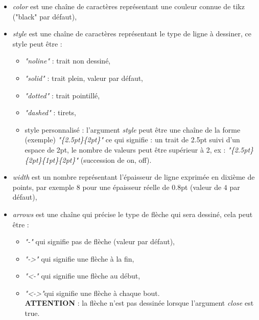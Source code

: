 \begin{itemize}
\item \emph{color} est une chaîne de caractères représentant une couleur connue de tikz ("black" par défaut),
\item \emph{style} est une chaîne de caractères représentant le type de ligne à dessiner, ce style peut être :
 \begin{itemize}
  \item \emph{"noline"} : trait non dessiné,
  \item \emph{"solid"} : trait plein, valeur par défaut,
  \item \emph{"dotted"} : trait pointillé,
  \item \emph{"dashed"} : tirets,
  \item style personnalisé : l'argument \emph{style} peut être une chaîne de la forme (exemple) \emph{"\{2.5pt\}\{2pt\}"} ce qui signifie : un trait de 2.5pt suivi d'un espace de 2pt, le nombre de valeurs peut être supérieur à 2, ex : \emph{"\{2.5pt\}\{2pt\}\{1pt\}\{2pt\}"} (succession de on, off).
  \end{itemize}
\item \emph{width} est un nombre représentant l'épaisseur de ligne exprimée en dixième de points, par exemple $8$ pour une épaisseur réelle de 0.8pt (valeur de $4$ par défaut),
\item \emph{arrows} est une chaîne qui précise le type de flèche qui sera dessiné, cela peut être :
 \begin{itemize}
  \item \emph{"-"} qui signifie pas de flèche (valeur par défaut),
  \item \emph{"->"} qui signifie une flèche à la fin,
  \item \emph{"<-"} qui signifie une flèche au début,
  \item \emph{"<->"}qui signifie une flèche à chaque bout.\\
  \textbf{ATTENTION} : la flèche n'est pas dessinée lorsque l'argument \emph{close} est true.
  \end{itemize}
\end{itemize}


